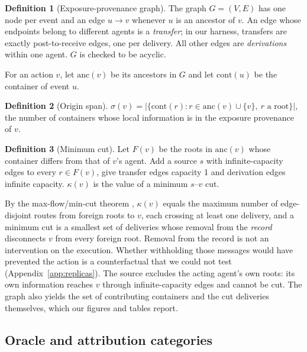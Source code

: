\documentclass[11pt, a4paper]{article}
\theoremstyle{definition}
\newtheorem{definition}{Definition}
\begin{document}
\begin{definition}[Exposure-provenance graph]
The graph $G=(V,E)$ has one node per event and an edge $u\to v$ whenever $u$ is an ancestor of $v$. An edge whose endpoints belong to different agents is a \emph{transfer}; in our harness, transfers are exactly post-to-receive edges, one per delivery. All other edges are \emph{derivations} within one agent. $G$ is checked to be acyclic.
\end{definition}

For an action $v$, let $\mathrm{anc}(v)$ be its ancestors in $G$ and let $\mathrm{cont}(u)$ be the container of event $u$.

\begin{definition}[Origin span]
$\sigma(v)=\left|\{\mathrm{cont}(r) : r\in \mathrm{anc}(v)\cup\{v\},\ r \text{ a root}\}\right|$, the number of containers whose local information is in the exposure provenance of $v$.
\end{definition}

\begin{definition}[Minimum cut]
Let $F(v)$ be the roots in $\mathrm{anc}(v)$ whose container differs from that of $v$'s agent. Add a source $s$ with infinite-capacity edges to every $r\in F(v)$, give transfer edges capacity 1 and derivation edges infinite capacity. $\kappa(v)$ is the value of a minimum $s$--$v$ cut.
\end{definition}

By the max-flow/min-cut theorem \citep{ford1956}, $\kappa(v)$ equals the maximum number of edge-disjoint routes from foreign roots to $v$, each crossing at least one delivery, and a minimum cut is a smallest set of deliveries whose removal from the \emph{record} disconnects $v$ from every foreign root. Removal from the record is not an intervention on the execution. Whether withholding those messages would have prevented the action is a counterfactual that we could not test (Appendix~\ref{app:replicas}). The source excludes the acting agent's own roots: its own information reaches $v$ through infinite-capacity edges and cannot be cut. The graph also yields the set of contributing containers and the cut deliveries themselves, which our figures and tables report.

\subsection{Oracle and attribution categories}
\label{sec:oracle}
\end{document}
